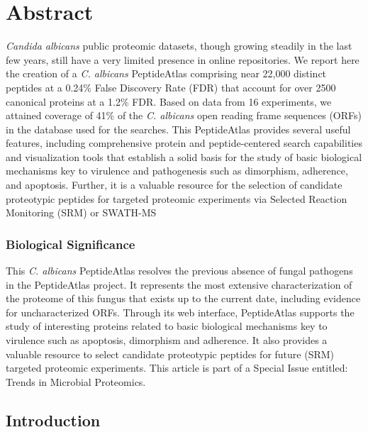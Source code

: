 \newpage


%
%



\chapter*{Abstract}
\textit{Candida albicans} public proteomic datasets, though growing
 steadily in the last few years, still have a very limited presence in
 online repositories. We report here the creation of a \textit{C. albicans} PeptideAtlas
 comprising near 22,000 distinct peptides at a 0.24\% False Discovery
 Rate (FDR) that account for over 2500 canonical proteins at a 1.2\% FDR.
 Based on data from 16 experiments, we attained coverage of 41\% of the 
 \textit{C. albicans} open reading frame sequences (ORFs) in the database used 
 for the searches. This PeptideAtlas provides several useful features, 
 including comprehensive protein and peptide-centered search 
 capabilities and visualization tools that establish a solid basis for 
 the study of basic biological mechanisms key to virulence and 
 pathogenesis such as dimorphism, adherence, and apoptosis. 
 Further, it is a valuable resource for the selection of candidate 
 proteotypic peptides for targeted proteomic experiments via Selected
 Reaction Monitoring (SRM) or SWATH-MS

\subsection*{Biological Significance}
This \textit{C. albicans} PeptideAtlas resolves the previous absence of fungal 
pathogens in the PeptideAtlas project. It represents the most extensive
characterization of the proteome of this fungus that exists up to the 
current date, including evidence for uncharacterized ORFs. Through its 
web interface, \mbox{PeptideAtlas} supports the study of interesting proteins 
related to basic biological mechanisms key to virulence such as 
apoptosis, dimorphism and adherence. It also provides a valuable 
resource to select candidate proteotypic peptides for future (SRM) 
targeted proteomic experiments. 
This article is part of a Special Issue entitled: Trends in Microbial Proteomics.

\newpage


\section*{Introduction}

